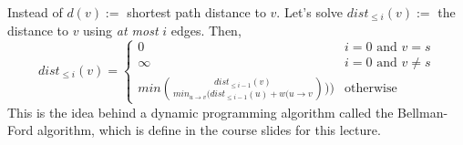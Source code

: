 \documentclass[titlepage, 12pt, leqno]{article}
\begin{document}
Instead of $d(v) :=$ shortest path distance to $v$. Let's solve $dist_{\le i}(v)
:=$ the distance to $v$ using \textit{at most} $i$ edges. Then,
\[
dist_{\le i}(v) =
\begin{cases}
    0 & i=0 \text{ and } v=s \\
    \infty & i=0 \text{ and } v \ne s \\
    min \binom{dist_{\le i-1}(v)}{min_{u\rightarrow v}(dist_{\le i-1}(u) +
w(u\rightarrow v})) & \text{otherwise}
\end{cases}
\]
This is the idea behind a dynamic programming algorithm called the Bellman-Ford
algorithm, which is define in the course slides for this lecture.
\end{document}
